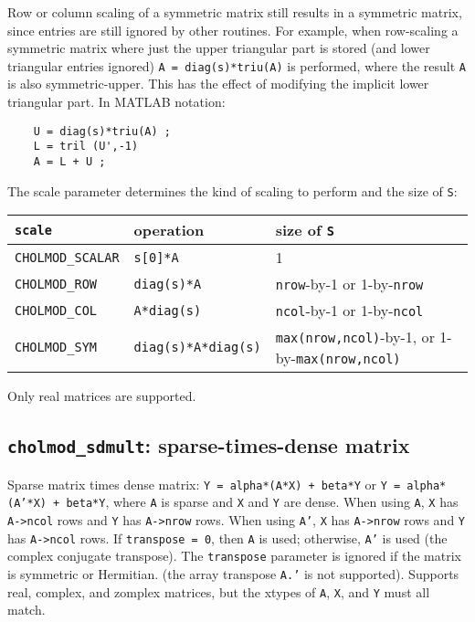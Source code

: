 \documentclass[11pt]{article}
\begin{document}
Row or column scaling of a symmetric matrix still results in a symmetric
matrix, since entries are still ignored by other routines.
For example, when row-scaling a symmetric matrix where just the upper
triangular part is stored (and lower triangular entries ignored)
{\tt A = diag(s)*triu(A)} is performed, where the result {\tt A} is also
symmetric-upper.  This has the effect of modifying the implicit lower
triangular part.  In MATLAB notation:
\begin{verbatim}
    U = diag(s)*triu(A) ;
    L = tril (U',-1)
    A = L + U ;
\end{verbatim}

The scale parameter determines the kind of scaling to perform and the size of {\tt S}:

\begin{tabular}{lll}
\hline
{\tt scale} & operation & size of {\tt S} \\
\hline
{\tt CHOLMOD\_SCALAR} & {\tt s[0]*A}		& 1 \\
{\tt CHOLMOD\_ROW}    & {\tt diag(s)*A}		& {\tt nrow}-by-1 or 1-by-{\tt nrow} \\
{\tt CHOLMOD\_COL}    & {\tt A*diag(s)}		& {\tt ncol}-by-1 or 1-by-{\tt ncol} \\
{\tt CHOLMOD\_SYM}    & {\tt diag(s)*A*diag(s)}	& {\tt max(nrow,ncol)}-by-1, or 1-by-{\tt max(nrow,ncol)} \\
\hline
\end{tabular}

Only real matrices are supported.

\newpage \subsection{{\tt cholmod\_sdmult}: sparse-times-dense matrix}


Sparse matrix times dense matrix:
{\tt Y = alpha*(A*X) + beta*Y} or {\tt Y = alpha*(A'*X) + beta*Y},
where {\tt A} is sparse and {\tt X} and {\tt Y} are dense.
When using {\tt A},
{\tt X} has {\tt A->ncol} rows and
{\tt Y} has {\tt A->nrow} rows.
When using {\tt A'},
{\tt X} has {\tt A->nrow} rows and
{\tt Y} has {\tt A->ncol} rows.
If {\tt transpose = 0}, then {\tt A} is used;
otherwise, {\tt A'} is used (the complex conjugate transpose).
The {\tt transpose} parameter is ignored if the matrix is symmetric or Hermitian.
(the array transpose {\tt A.'} is not supported).
Supports real, complex, and zomplex matrices, but the xtypes of {\tt A}, {\tt X}, and {\tt Y} must all match.
\end{document}

